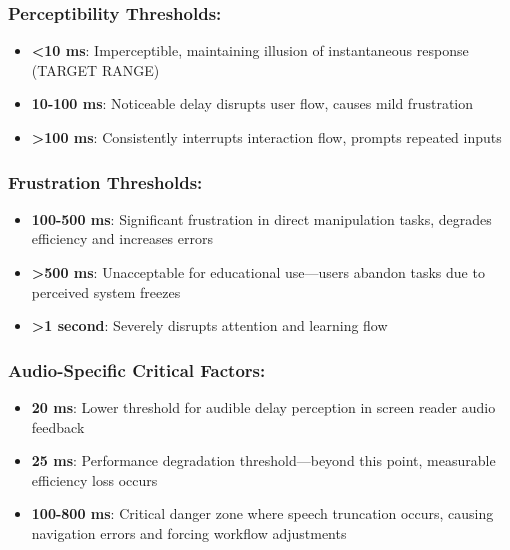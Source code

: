 \subsubsection{Perceptibility Thresholds:}

\begin{itemize}
\item \textbf{<10 ms}: Imperceptible, maintaining illusion of instantaneous response (TARGET RANGE) \cite{Nielsen1993UsabilityEngineering}
\item \textbf{10-100 ms}: Noticeable delay disrupts user flow, causes mild frustration \cite{Miller1968ReactionTime}
\item \textbf{>100 ms}: Consistently interrupts interaction flow, prompts repeated inputs \cite{Shneiderman1998DesigningTheUserInterface}
\end{itemize}


\subsubsection{Frustration Thresholds:}

\begin{itemize}
\item \textbf{100-500 ms}: Significant frustration in direct manipulation tasks, degrades efficiency and increases errors \cite{Card1983ThePsychologyOfHumanComputerInteraction}
\item \textbf{>500 ms}: Unacceptable for educational use—users abandon tasks due to perceived system freezes \cite{Sears1993TheEffectOfResponseTime}
\item \textbf{>1 second}: Severely disrupts attention and learning flow \cite{Dix2004HumanComputerInteraction}
\end{itemize}


\subsubsection{Audio-Specific Critical Factors:}

\begin{itemize}
\item \textbf{20 ms}: Lower threshold for audible delay perception in screen reader audio feedback \cite{Grunwald1999AuditoryLatency}
\item \textbf{25 ms}: Performance degradation threshold—beyond this point, measurable efficiency loss occurs \cite{Fowler2011ScreenReaderLatency}
\item \textbf{100-800 ms}: Critical danger zone where speech truncation occurs, causing navigation errors and forcing workflow adjustments \cite{Bigham2014UnderstandingScreenReaderUsage}
\end{itemize}


